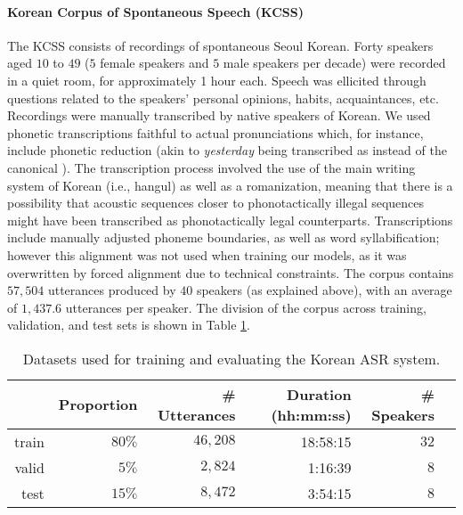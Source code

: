 \paragraph{Korean Corpus of Spontaneous Speech (KCSS)}

The KCSS \cite{yun2015} consists of recordings of spontaneous Seoul Korean. Forty speakers aged $10$ to $49$ ($5$ female speakers and $5$ male speakers per decade) were recorded in a quiet room, for approximately 1 hour each. Speech was ellicited through questions related to the speakers' personal opinions, habits, acquaintances, etc.      
Recordings were manually transcribed by native speakers of Korean. We used phonetic transcriptions faithful to actual pronunciations which, for instance, include phonetic reduction (akin to \textit{yesterday} being transcribed as  instead of the canonical ). The transcription process involved the use of the main writing system of Korean (i.e., hangul) as well as a romanization, meaning that there is a possibility that acoustic sequences closer to phonotactically illegal sequences might have been transcribed as phonotactically legal counterparts.   
Transcriptions include manually adjusted phoneme boundaries, as well as word syllabification; however this alignment was not used when training our models, as it was overwritten by forced alignment due to technical constraints.
The corpus contains $57,504$ utterances produced by $40$ speakers (as explained above), with an average of $1,437.6$ utterances per speaker. The division of the corpus across training, validation, and test sets is shown in Table \ref{tab:hmm_kcss}.

\begin{table}[htb]
\centering
\caption{Datasets used for training and evaluating the Korean ASR system.}
\label{tab:hmm_kcss}
\vspace{0.25cm}
\begin{tabular}{rrrrrr}
  \toprule
      & Proportion & \# Utterances & Duration (hh:mm:ss) & \# Speakers &  \\ \midrule
  train & $80\%$ &  $46,208$ &   18:58:15   &   $32$    &  \\
  valid & $5\%$ &  $2,824$ &  1:16:39  &  $8$  &  \\
  test  & $15\%$ &  $8,472$ & 3:54:15   & $8$    & \\ \bottomrule
\end{tabular}
\end{table}

